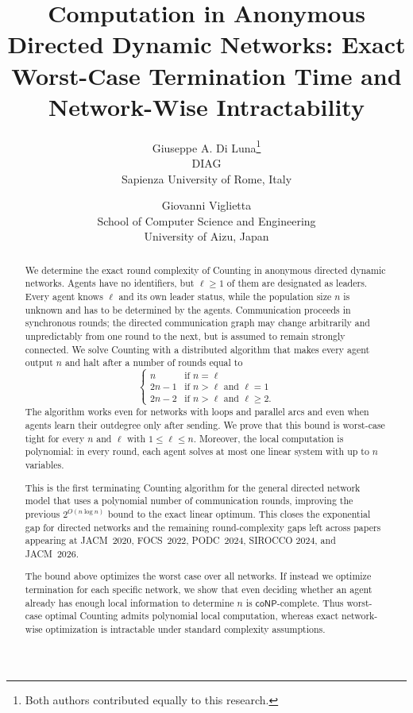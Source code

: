 \documentclass[11pt]{article}
\title{Computation in Anonymous Directed Dynamic Networks: Exact Worst-Case Termination Time and Network-Wise Intractability}
\author{Giuseppe A. Di Luna\thanks{Both authors contributed equally to this research.}
  \\ \normalsize DIAG
  \\ \normalsize Sapienza University of Rome, Italy
  \and Giovanni Viglietta\footnotemark[1]
  \\ \normalsize School of Computer Science and Engineering
  \\ \normalsize University of Aizu, Japan}
\date{}
\begin{document}
\hypersetup{pageanchor=false}
\begin{titlepage}
\maketitle
\thispagestyle{empty}

\begin{abstract}
We determine the exact round complexity of Counting in anonymous directed
dynamic networks.  Agents have no identifiers, but \(\ell\geq1\) of them are
designated as leaders.  Every agent knows \(\ell\) and
its own leader status, while the population size \(n\) is unknown and has to be determined by the agents.
Communication proceeds in synchronous rounds; the directed communication graph
may change arbitrarily and unpredictably from one round to the next, but is assumed to remain strongly connected.  We solve Counting with a distributed algorithm
that makes every agent output \(n\) and halt after a number of rounds equal to
\[
 \begin{cases}
  n&\text{if }n=\ell\\
  2n-1&\text{if \(n>\ell\) and \(\ell=1\)}\\
  2n-2&\text{if \(n>\ell\) and \(\ell\geq2\)}.
 \end{cases}
\]
The algorithm works even for networks with loops and parallel arcs and even
when agents learn their outdegree only after sending.  We prove that this bound
is worst-case tight for every \(n\) and \(\ell\) with \(1\leq\ell\leq n\).  Moreover, the local computation is
polynomial: in every round, each agent solves at most one linear system with
up to \(n\) variables.

This is the first terminating Counting algorithm for the general directed network model that uses a polynomial number of communication rounds,
improving the previous \(2^{O(n\log n)}\) bound to the exact linear optimum.
This closes the exponential gap for directed networks and the
remaining round-complexity gaps left across papers appearing at JACM~2020, FOCS~2022, PODC~2024, SIROCCO 2024, and JACM~2026.

The bound above optimizes the worst case over all networks. If instead we optimize termination for each specific network, we show that even deciding whether an agent already has enough local information to determine \(n\) is \(\mathsf{coNP}\)-complete. Thus
worst-case optimal Counting admits polynomial
local computation, whereas exact network-wise optimization is intractable
under standard complexity assumptions.


\end{abstract}
\end{titlepage}
\end{document}
